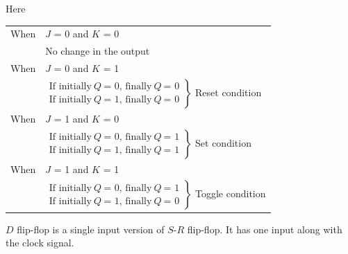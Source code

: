 Here

\vspace{1em}
\begin{tabular}{ll}
When & $J$ = 0 and $K$ = 0 \\
& No change in the output \\
When & $J$ = 0 and $K$ = 1 \\
& $\left. \begin{array}{l}
   \text{If initially}\ Q\ \text{= 0, finally}\ Q\ \text{= 0}\\
   \text{If initially}\ Q\ \text{= 1, finally}\ Q\ \text{= 0}
\end{array}
\right\}$ Reset condition\\

When & $J$ = 1 and $K$ = 0 \\
& $\left. \begin{array}{l}
   \text{If initially}\ Q\ \text{= 0, finally}\ Q\ \text{= 1}\\
   \text{If initially}\ Q\ \text{= 1, finally}\ Q\ \text{= 1}
\end{array}
\right\}$ Set condition\\

When & $J$ = 1 and $K$ = 1 \\
& $\left. \begin{array}{l}
   \text{If initially}\ Q\ \text{= 0, finally}\ Q\ \text{= 1}\\
   \text{If initially}\ Q\ \text{= 1, finally}\ Q\ \text{= 0}
\end{array}
\right\}$ Toggle condition\\
\end{tabular}


\pagebreak
{}
$D$ flip-flop is a single input version of $S$-$R$ flip-flop. It has one input along with the clock signal.

